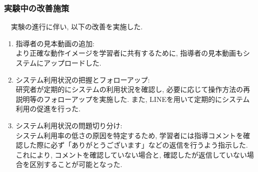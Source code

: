 \subsubsection{実験中の改善施策}
　実験の進行に伴い, 以下の改善を実施した.\\

\begin{enumerate}
    \item 指導者の見本動画の追加:\\
    より正確な動作イメージを学習者に共有するために, 指導者の見本動画もシステムにアップロードした.
    \item システム利用状況の把握とフォローアップ:\\
    研究者が定期的にシステムの利用状況を確認し, 必要に応じて操作方法の再説明等のフォローアップを実施した. また, LINEを用いて定期的にシステム利用の促進を行った.
    \item システム利用状況の問題切り分け:\\
    システム利用率の低さの原因を特定するため, 学習者には指導コメントを確認した際に必ず「ありがとうございます」などの返信を行うよう指示した. これにより, コメントを確認していない場合と, 確認したが返信していない場合を区別することが可能となった.
\end{enumerate}




